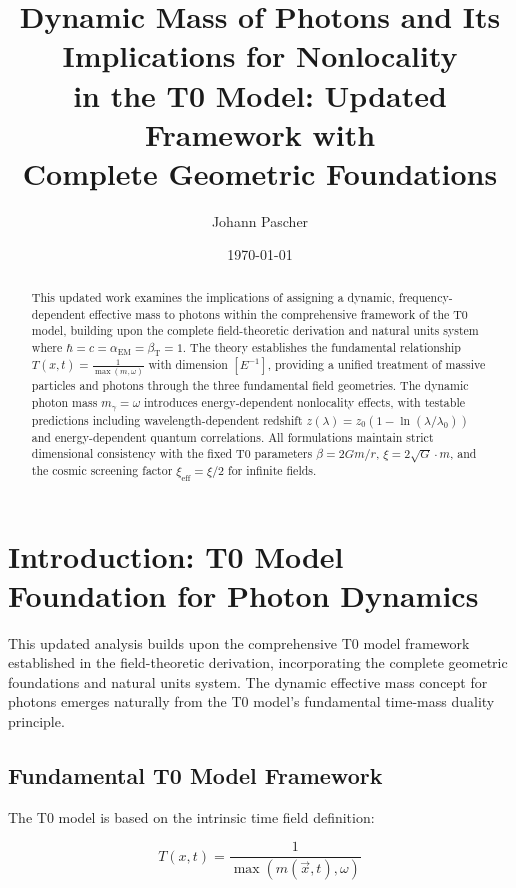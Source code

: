 \documentclass[12pt,a4paper]{article}
\title{Dynamic Mass of Photons and Its Implications for Nonlocality \\ in the T0 Model: Updated Framework with \\ Complete Geometric Foundations}
\author{Johann Pascher}
\date{\today}
\newcommand{\Tfield}{T(x,t)}
\begin{document}
	
	\maketitle
	
	\begin{abstract}
		This updated work examines the implications of assigning a dynamic, frequency-dependent effective mass to photons within the comprehensive framework of the T0 model, building upon the complete field-theoretic derivation and natural units system where $\hbar = c = \alpha_{\text{EM}} = \beta_{\text{T}} = 1$. The theory establishes the fundamental relationship $\Tfield = \frac{1}{\max(m, \omega)}$ with dimension $[E^{-1}]$, providing a unified treatment of massive particles and photons through the three fundamental field geometries. The dynamic photon mass $m_\gamma = \omega$ introduces energy-dependent nonlocality effects, with testable predictions including wavelength-dependent redshift $z(\lambda) = z_0(1 - \ln(\lambda/\lambda_0))$ and energy-dependent quantum correlations. All formulations maintain strict dimensional consistency with the fixed T0 parameters $\beta = 2Gm/r$, $\xi = 2\sqrt{G} \cdot m$, and the cosmic screening factor $\xi_{\text{eff}} = \xi/2$ for infinite fields.
	\end{abstract}
	
	\tableofcontents
	\newpage
	
	\section{Introduction: T0 Model Foundation for Photon Dynamics}
	
	This updated analysis builds upon the comprehensive T0 model framework established in the field-theoretic derivation, incorporating the complete geometric foundations and natural units system. The dynamic effective mass concept for photons emerges naturally from the T0 model's fundamental time-mass duality principle.
	
	\subsection{Fundamental T0 Model Framework}
	
	The T0 model is based on the intrinsic time field definition:
	
	\begin{equation}
		\boxed{\Tfield = \frac{1}{\max(m(\vec{x},t), \omega)}}
		\label{eq:intrinsic_time_field}
	\end{equation}
	
\end{document}
